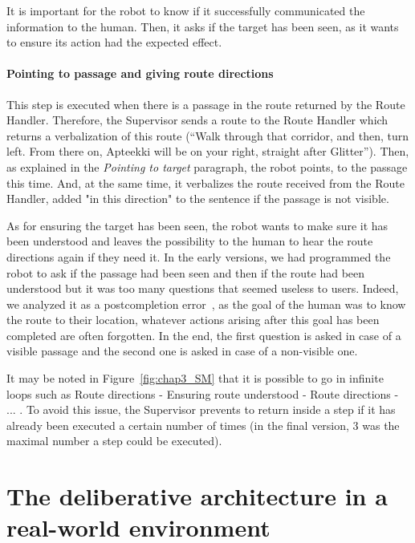 \documentclass[a4paper,11pt,twoside]{StyleThese}
\begin{document}
It is important for the robot to know if it successfully communicated the information to the human. Then, it asks if the target has been seen, as it wants to ensure its action had the expected effect.

\paragraph{Pointing to passage and giving route directions}\label{par:route_understood}
This step is executed when there is a passage in the route returned by the Route Handler. Therefore, the Supervisor sends a route to the Route Handler which returns a verbalization of this route (\eg ``Walk through that corridor, and then, turn left. From there on, Apteekki will be on your right, straight after Glitter''). Then, as explained in the \emph{Pointing to target} paragraph, the robot points, to the passage this time. And, at the same time, it verbalizes the route received from the Route Handler, added "in this direction" to the sentence if the passage is not visible.

As for ensuring the target has been seen, the robot wants to make sure it has been understood and leaves the possibility to the human to hear the route directions again if they need it. In the early versions, we had programmed the robot to ask if the passage had been seen and then if the route had been understood but it was too many questions that seemed useless to users. Indeed, we analyzed it as a postcompletion error~\citep{byrne_1997}, as the goal of the human was to know the route to their location, whatever actions arising after this goal has been completed are often forgotten. In the end, the first question is asked in case of a visible passage and the second one is asked in case of a non-visible one.

It may be noted in Figure~\ref{fig:chap3_SM} that it is possible to go in infinite loops such as Route directions - Ensuring route understood - Route directions - ... . To avoid this issue, the Supervisor prevents to return inside a step if it has already been executed a certain number of times (in the final version, 3 was the maximal number a step could be executed).

\section{The deliberative architecture in a real-world environment}\label{subsec:archi-integration}
\end{document}

